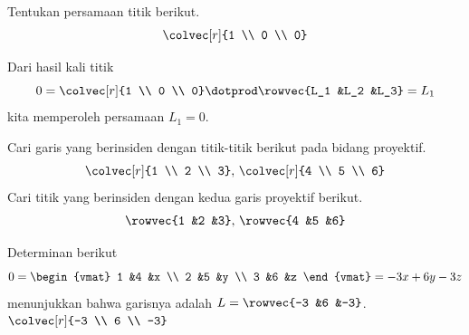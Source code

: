 \begin{exercises}
  \item 
    Tentukan persamaan titik berikut.
    \begin{equation*}
       \colvec[r]{1 \\ 0 \\ 0}
    \end{equation*}
    \begin{answer}
      Dari hasil kali titik
      \begin{equation*}
        0=\colvec[r]{1 \\ 0 \\ 0}\dotprod\rowvec{L_1 &L_2 &L_3}
         =L_1
      \end{equation*}
      kita memperoleh persamaan $L_1=0$.
    \end{answer}
  \item 
    \begin{exparts}
      \partsitem Cari garis yang berinsiden dengan titik-titik berikut pada
         bidang proyektif.
         \begin{equation*}
           \colvec[r]{1 \\ 2 \\ 3},\,\colvec[r]{4 \\ 5 \\ 6}
         \end{equation*}
      \partsitem Cari titik yang berinsiden dengan kedua garis proyektif berikut.
         \begin{equation*}
           \rowvec{1 &2 &3},\,\rowvec{4 &5 &6}
         \end{equation*} 
    \end{exparts}
    \begin{answer}
      \begin{exparts}
        \partsitem Determinan berikut
          \begin{equation*}
            0=\begin{vmat}
              1  &4  &x \\
              2  &5  &y \\
              3  &6  &z
            \end{vmat}
            =-3x+6y-3z
          \end{equation*}
          menunjukkan bahwa garisnya adalah $L=\rowvec{-3 &6 &-3}$.
        \partsitem $\colvec[r]{-3 \\ 6 \\ -3}$
      \end{exparts}
    \end{answer}

\end{exercises}
